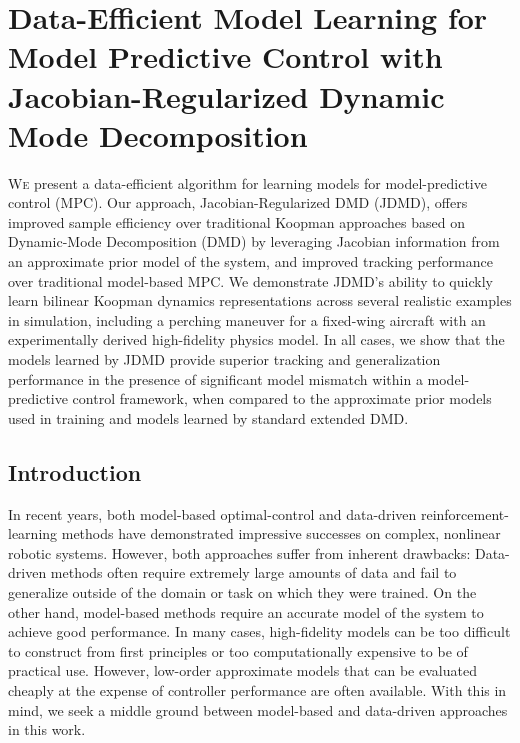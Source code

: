 \documentclass[../root.tex]{subfiles}
\begin{document}
\chapter{
  Data-Efficient Model Learning for Model Predictive Control with
  Jacobian-Regularized Dynamic Mode Decomposition
} \label{chap:jdmd}

\lettrine{W}e present a data-efficient algorithm for learning models for model-predictive
control (MPC). Our approach, Jacobian-Regularized DMD (JDMD), offers improved
sample efficiency over traditional Koopman approaches based on Dynamic-Mode
Decomposition (DMD) by leveraging Jacobian  information from an approximate
prior model of the system, and improved tracking performance over traditional
model-based MPC. We demonstrate JDMD's ability to quickly learn bilinear
Koopman dynamics representations across several realistic examples in
simulation, including a perching maneuver for a fixed-wing aircraft with an
experimentally derived high-fidelity physics model.   In all cases, we show
that the models learned by JDMD provide superior tracking and generalization
performance in the presence of significant model mismatch within a
model-predictive control framework,  when compared to the approximate prior
models used in training and models learned by  standard extended DMD.

\section{Introduction}

In recent years, both model-based optimal-control
\cite{farshidian_Efficient_2017, kuindersma_Efficiently_2014, bjelonic_WholeBody_2021, subosits_Racetrack_2019}
and data-driven
reinforcement-learning methods \cite{karnchanachari_Practical_2020,li_Reinforcement_2021}
 have
demonstrated impressive successes on complex, nonlinear robotic systems.
However, both approaches suffer from inherent drawbacks: Data-driven methods
often require extremely large amounts of data and fail to generalize outside of
the domain or task on which they were trained. On the other hand, model-based
methods require an accurate model of the system to achieve good performance. In
many cases, high-fidelity models can be too difficult to construct from first
principles or too computationally expensive to be of practical use. However,
low-order approximate models that can be evaluated cheaply at the expense of
controller performance are often available. With this in mind, we seek a middle
ground between model-based and data-driven approaches in this work. 
\end{document}
